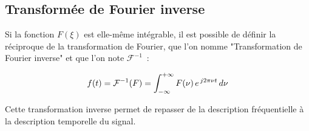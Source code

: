 \subsection*{Transformée de Fourier inverse }

Si la fonction $F(\xi)$ est elle-même intégrable, il est possible de définir la réciproque de la transformation de Fourier, que l'on nomme "Transformation de Fourier inverse" et que l'on note $\mathcal{F}^{-1}$~:

\begin{equation*}
	f(t) = \mathcal{F}^{-1}(F)=\int_{-\infty}^{+\infty}F(\nu)\,e^{\,j2\pi\nu t}\,d\nu \\
\end{equation*}

Cette transformation inverse permet de repasser de la description fréquentielle à la description temporelle du signal. 

\vfill
\pagebreak
